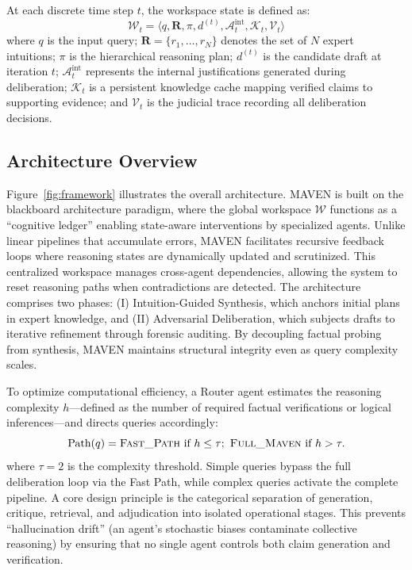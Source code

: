 \documentclass{article}
\begin{document}
At each discrete time step $t$, the workspace state is defined as:
\begin{equation}
    \mathcal{W}_t = \langle q, \mathbf{R}, \pi, d^{(t)}, \mathcal{A}_t^{\text{int}}, \mathcal{K}_t, \mathcal{V}_t \rangle
\end{equation}
where $q$ is the input query; $\mathbf{R} = \{r_1, \ldots, r_N\}$ denotes the set of $N$ expert intuitions; $\pi$ is the hierarchical reasoning plan; $d^{(t)}$ is the candidate draft at iteration $t$; $\mathcal{A}_t^{\text{int}}$ represents the internal justifications generated during deliberation; $\mathcal{K}_t$ is a persistent knowledge cache mapping verified claims to supporting evidence; and $\mathcal{V}_t$ is the judicial trace recording all deliberation decisions.

\subsection{Architecture Overview}
\label{subsec:architecture}

Figure~\ref{fig:framework} illustrates the overall architecture. MAVEN is built on the blackboard architecture paradigm, where the global workspace $\mathcal{W}$ functions as a ``cognitive ledger'' enabling state-aware interventions by specialized agents. Unlike linear pipelines that accumulate errors, MAVEN facilitates recursive feedback loops where reasoning states are dynamically updated and scrutinized. This centralized workspace manages cross-agent dependencies, allowing the system to reset reasoning paths when contradictions are detected. The architecture comprises two phases: (I) Intuition-Guided Synthesis, which anchors initial plans in expert knowledge, and (II) Adversarial Deliberation, which subjects drafts to iterative refinement through forensic auditing. By decoupling factual probing from synthesis, MAVEN maintains structural integrity even as query complexity scales.

To optimize computational efficiency, a Router agent estimates the reasoning complexity $h$---defined as the number of required factual verifications or logical inferences---and directs queries accordingly:
\[
\text{Path}(q)=
\textsc{Fast\_Path}\ \text{if } h\le\tau;\ 
\textsc{Full\_Maven}\ \text{if } h>\tau.
\]
where $\tau = 2$ is the complexity threshold. Simple queries bypass the full deliberation loop via the Fast Path, while complex queries activate the complete pipeline. A core design principle is the categorical separation of generation, critique, retrieval, and adjudication into isolated operational stages. This prevents ``hallucination drift'' (an agent's stochastic biases contaminate collective reasoning) by ensuring that no single agent controls both claim generation and verification.
\end{document}
